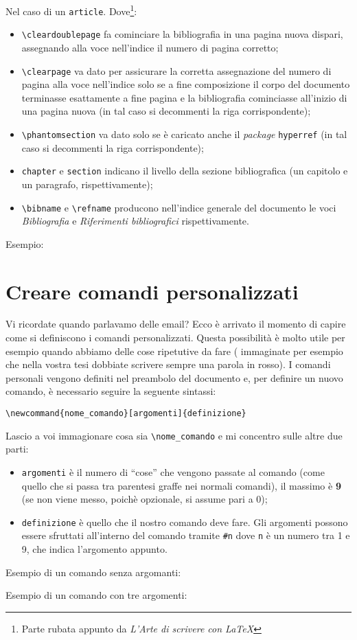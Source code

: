 
Nel caso di un \verb!article!. Dove\footnote{Parte rubata appunto da 
\textit{L'Arte di scrivere con \LaTeX{}}}:
\begin{itemize}
    \item \verb!\cleardoublepage! fa cominciare la bibliografia in una pagina 
    nuova dispari, assegnando alla voce nell’indice il numero di pagina 
    corretto;
    \item \verb!\clearpage! va dato per assicurare la corretta assegnazione 
    del numero di pagina alla voce nell’indice solo se a fine composizione il 
    corpo del documento terminasse esattamente a fine pagina e la bibliografia 
    cominciasse all’inizio di una pagina nuova (in tal caso si decommenti la 
    riga corrispondente);
    \item \verb!\phantomsection! va dato solo se è caricato anche il \textit{
    package} \verb!hyperref! (in tal caso si decommenti la riga 
    corrispondente);
    \item \verb!chapter! e \verb!section! indicano il livello della sezione 
    bibliografica (un capitolo e un paragrafo, rispettivamente);
    \item \verb!\bibname! e \verb!\refname! producono nell’indice generale del 
    documento le voci \emph{Bibliografia} e \emph{Riferimenti bibliografici}
    rispettivamente.
\end{itemize}
Esempio:



\section{Creare comandi personalizzati}
Vi ricordate quando parlavamo delle email? Ecco è arrivato il momento di 
capire come si definiscono i comandi personalizzati. Questa possibilità è 
molto utile per esempio quando abbiamo delle cose ripetutive da fare (
immaginate per esempio che nella vostra tesi dobbiate scrivere sempre una 
parola in rosso). I comandi personali vengono definiti nel preambolo del 
documento e, per definire un nuovo comando, è necessario seguire la seguente 
sintassi: \\
\begin{center}
    \verb!\newcommand{nome_comando}[argomenti]{definizione}!
\end{center}
Lascio a voi immagionare cosa sia \verb!\nome_comando! e mi concentro sulle altre due parti:
\begin{itemize}
    \item \verb!argomenti! è il numero di ``cose'' che vengono passate al 
    comando (come quello che si passa tra parentesi graffe nei normali 
    comandi), il massimo è \textbf{9} (se non viene messo, poichè opzionale, 
    si assume pari a 0);
    \item \verb!definizione! è quello che il nostro comando deve fare. Gli 
    argomenti possono essere sfruttati all'interno del comando tramite 
    \verb!#n! dove \verb!n! è un numero tra 1 e 9, che indica l'argomento 
    appunto.
\end{itemize}

Esempio di un comando senza argomanti:


Esempio di un comando con tre argomenti:
